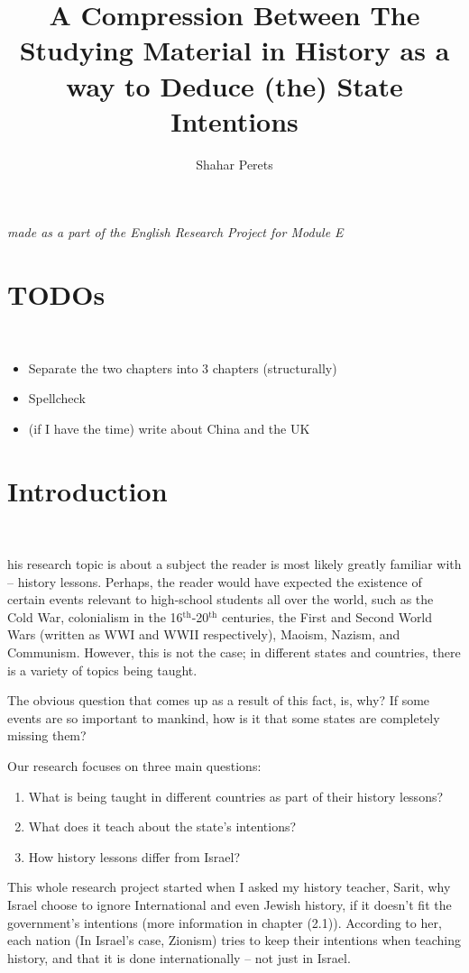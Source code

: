 \documentclass[12pt]{../../../tex/classes/styledArticle}
\author{Shahar Perets}
\title{A Compression Between The Studying Material in History as a way to Deduce {\large(the)} State Intentions}
\newcommand\aftertitle{\ \!\!\!\!\!\!\!\!\!\!}
\begin{document}
	\maketitle
	
	\hfil\textit{made as a part of the English Research Project for Module E}
	
	\section{TODOs}\aftertitle
	\begin{itemize}
		\item Separate the two chapters into 3 chapters (structurally)
		\item Spellcheck
		\item (if I have the time) write about China and the UK
	\end{itemize}
	
	\section{Introduction}\aftertitle
	
	his research topic is about a subject the reader is most likely greatly familiar with -- history lessons. Perhaps, the reader would have expected the existence of certain events relevant to high-school students all over the world, such as the Cold War, colonialism in the 16$^{\text{th}}$-20$^{\text{th}}$ centuries, the First and Second World Wars (written as WWI and WWII respectively), Maoism, Nazism, and Communism. However, this is not the case; in different states and countries, there is a variety of topics being taught. 
	
	The obvious question that comes up as a result of this fact, is, why? If some events are so important to mankind, how is it that some states are completely missing them? 
	
	Our research focuses on three main questions: 
	\begin{enumerate}
		\item What is being taught in different countries as part of their history lessons? 
		\item What does it teach about the state's intentions? 
		\item How history lessons differ from Israel? 
	\end{enumerate}
	
	This whole research project started when I asked my history teacher, Sarit, why Israel choose to ignore International and even Jewish history, if it doesn't fit the government's intentions (more information in chapter (2.1)). According to her, each nation (In Israel's case, Zionism) tries to keep their intentions when teaching history, and that it is done internationally -- not just in Israel. 
	
\end{document}
